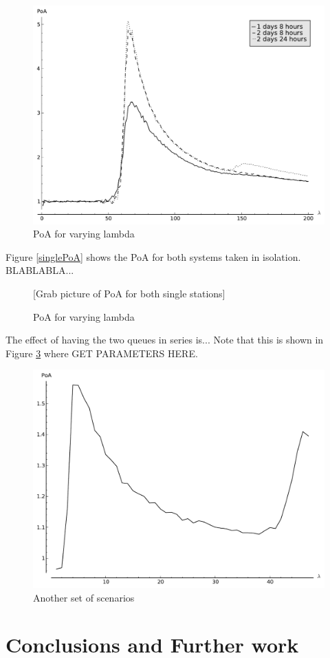 \documentclass[12pt]{article}
\begin{document}
\begin{figure}[!hbtp]
    \begin{center}
        \includegraphics[width=.5\textwidth]{Images/Ana_Lambda.pdf}
    \end{center}
    \caption{PoA for varying lambda}\label{ana_lambda}
\end{figure}

Figure \ref{singlePoA} shows the PoA for both systems taken in isolation. BLABLABLA...

\begin{figure}[!hbtp]
    \begin{center}
        [Grab picture of PoA for both single stations]
    \end{center}
    \caption{PoA for varying lambda}\label{ana_lambda}
\end{figure}

The effect of having the two queues in series is...
Note that this is shown in Figure \ref{dualpeak} where GET PARAMETERS HERE.

\begin{figure}[!hbtp]
    \begin{center}
        \includegraphics[width=.6\textwidth]{Images/DualPeak.pdf}
    \end{center}
    \caption{Another set of scenarios}\label{dualpeak}
\end{figure}

\section{Conclusions and Further work}\label{conclusions}
\end{document}
